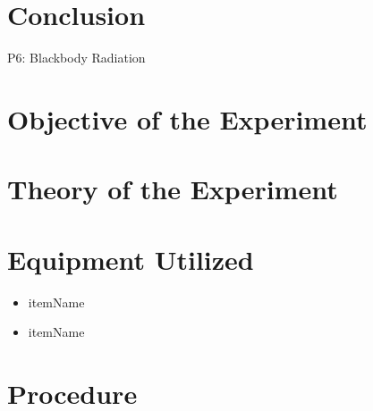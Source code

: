 \documentclass[a4paper]{article}
\begin{document}
\qq 

\section{Conclusion}

\newpage

P6: Blackbody Radiation

\newpage

\section{Objective of the Experiment}
\qq 

\section{Theory of the Experiment}


\section{Equipment Utilized}

\qq 

\begin{itemize}
\item itemName \\
\item itemName \\
\end{itemize}

\begin{figure}[H]
\centering
\label{Diagram}
\end{figure}

\section{Procedure}

\end{document}
